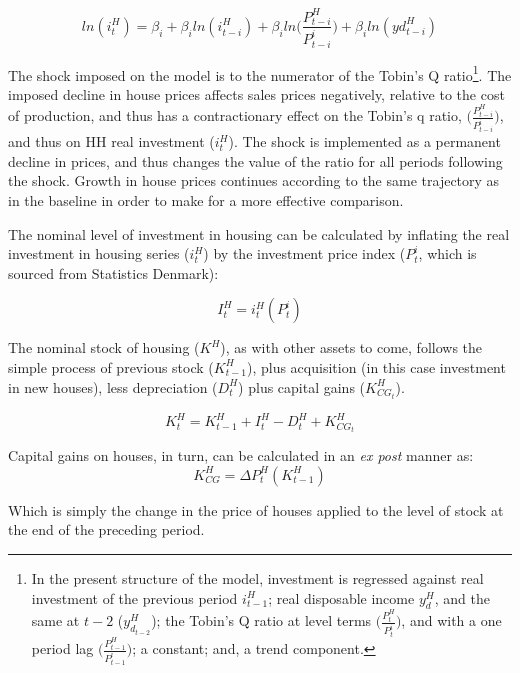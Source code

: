 \documentclass[
]{book}
\begin{document}
\begin{equation}
ln(i^H_t) = \beta _i + \beta _i ln(i^H_{t-i}) + \beta _i ln \Bigg( \frac{P^H_{t-i}}{P^i_{t-i}}\Bigg) + \beta _iln(yd^H_{t-i})
\label{eq:realhousinginvestment_intext}
\end{equation}

The shock imposed on the model is to the numerator of the Tobin's Q ratio\footnote{In the present structure of the model, investment is regressed against real investment of the previous period \(i^H_{t-1}\); real disposable income \(y^H_{d}\), and the same at \(t-2\) (\(y^H_{d_{t-2}}\)); the Tobin's Q ratio at level terms \(\Bigg( \frac{P^H_{t}}{P^i_{t}}\Bigg)\), and with a one period lag \(\Bigg( \frac{P^H_{t-1}}{P^i_{t-1}}\Bigg)\); a constant; and, a trend component.}. The imposed decline in house prices affects sales prices negatively, relative to the cost of production, and thus has a contractionary effect on the Tobin's q ratio, \(\Bigg(\frac{P^H_{t-i}}{P^i_{t-i}}\Bigg)\), and thus on HH real investment (\(i^H_t\)). The shock is implemented as a permanent decline in prices, and thus changes the value of the ratio for all periods following the shock. Growth in house prices continues according to the same trajectory as in the baseline in order to make for a more effective comparison.

The nominal level of investment in housing can be calculated by inflating the real investment in housing
series (\(i^H_t\)) by the investment price index (\(P^i_t\), which is sourced from Statistics Denmark):

\begin{equation}
I^H_t = i^H_t(P^i_t)
\end{equation}

The nominal stock of housing (\(K^H\)), as with other assets to come, follows the simple
process of previous stock (\(K^H_{t-1}\)), plus acquisition (in this case investment in new houses), less depreciation (\(D^H_t\)) plus capital gains (\(K^H_{CG_t}\)).

\begin{equation}
K^H_t = K^H_{t-1} + I^H_t - D^H_t + K^H_{CG_t}
\label{eq:nominalhoushingcapital1}
\end{equation}

Capital gains on houses, in turn, can be calculated in an \emph{ex post} manner as:
\begin{equation}
K^H_{CG} = \Delta P^H_t (K^H_{t-1})
\end{equation}

Which is simply the change in the price of houses applied to the level of stock at
the end of the preceding period.
\end{document}
